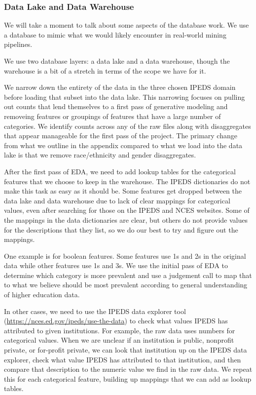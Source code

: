 \documentclass[sigconf, authorversion, nonacm]{acmart}
\begin{document}
    \subsubsection{Data Lake and Data Warehouse}
        We will take a moment to talk about some aspects of the database work. We use a database to mimic what we would likely encounter in real-world mining pipelines.

        We use two database layers: a data lake and a data warehouse, though the warehouse is a bit of a stretch in terms of the scope we have for it.

        We narrow down the entirety of the data in the three chosen IPEDS domain before loading that subset into the data lake. This narrowing focuses on pulling out counts that lend themselves to a first pass of generative modeling and removeing features or groupings of features that have a large number of categories. We identify counts across any of the raw files along with disaggregates that appear manageable for the first pass of the project. The primary change from what we outline in the appendix compared to what we load into the data lake is that we remove race/ethnicity and gender disaggregates.

        After the first pass of EDA, we need to add lookup tables for the categorical features that we choose to keep in the warehouse. The IPEDS dictionaries do not make this task as easy as it should be. Some features get dropped between the data lake and data warehouse due to lack of clear mappings for categorical values, even after searching for those on the IPEDS and NCES websites. Some of the mappings in the data dictionaries are clear, but others do not provide values for the descriptions that they list, so we do our best to try and figure out the mappings.

        One example is for boolean features. Some features use 1s and 2s in the original data while other features use 1s and 3s. We use the initial pass of EDA to determine which category is more prevalent and use a judgement call to map that to what we believe should be most prevalent according to general understanding of higher education data.

        In other cases, we need to use the IPEDS data explorer tool (\href{https://nces.ed.gov/ipeds/use-the-data}{https://nces.ed.gov/ipeds/use-the-data}) to check what values IPEDS has attributed to given institutions. For example, the raw data uses numbers for categorical values. When we are unclear if an institution is public, nonprofit private, or for-profit private, we can look that institution up on the IPEDS data explorer, check what value IPEDS has attributed to that institution, and then compare that description to the numeric value we find in the raw data. We repeat this for each categorical feature, building up mappings that we can add as lookup tables.
\end{document}
